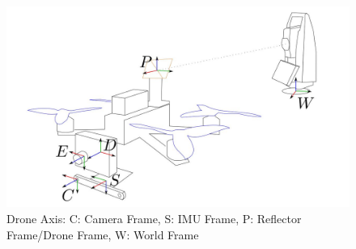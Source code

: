 \documentclass[bare_jrnl_transmag]{subfiles}
\begin{document}
\begin{figure}[H]
    \centering
    \includegraphics[width=0.8\linewidth]{figures/drone_axis.jpg}
    \caption{Drone Axis: C: Camera Frame, S: IMU Frame, P: Reflector Frame/Drone Frame, W: World Frame \cite{Delmerico19icra}}
    \label{fig:drone_axis}
    
\end{figure}
\end{document}
